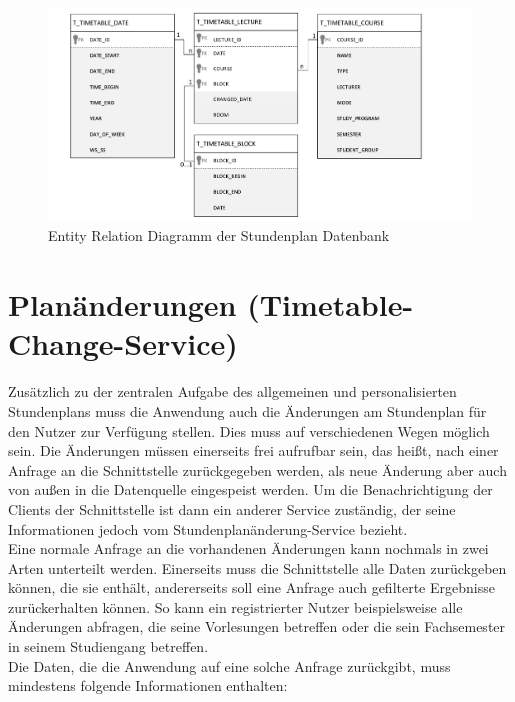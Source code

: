 \begin{figure}[H]
\centering
\includegraphics[width=\pictureWidth cm + 3 cm]{Bilder/ER/Timetable_ER.pdf}
\caption{Entity Relation Diagramm der Stundenplan Datenbank\label{fig:timetableER}\protect\footnotemark}
\end{figure}


\section{Planänderungen (Timetable-Change-Service)}
\label{sec:stundenplan}

Zusätzlich zu der zentralen Aufgabe des allgemeinen und personalisierten Stundenplans muss die Anwendung auch die Änderungen am Stundenplan für den Nutzer zur Verfügung stellen. Dies muss auf verschiedenen Wegen möglich sein. Die Änderungen müssen einerseits frei aufrufbar sein, das heißt, nach einer Anfrage an die Schnittstelle zurückgegeben werden, als neue Änderung aber auch von außen in die Datenquelle eingespeist werden. Um die Benachrichtigung der Clients der Schnittstelle ist dann ein anderer Service zuständig, der seine Informationen jedoch vom Stundenplanänderung-Service bezieht.
\\
\linebreak
Eine normale Anfrage an die vorhandenen Änderungen kann nochmals in zwei Arten unterteilt werden. Einerseits muss die Schnittstelle alle Daten zurückgeben können, die sie enthält, andererseits soll eine Anfrage auch gefilterte Ergebnisse zurückerhalten können. So kann ein registrierter Nutzer beispielsweise alle Änderungen abfragen, die seine Vorlesungen betreffen oder die sein Fachsemester in seinem Studiengang betreffen. 
\\
\linebreak
Die Daten, die die Anwendung auf eine solche Anfrage zurückgibt, muss mindestens folgende Informationen enthalten:

